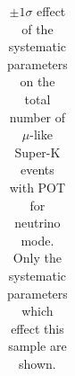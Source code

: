 \begin{table}
\begin{tabular}{| l | r | r | r  r | r  r |}
\hline

\end{tabular}
\caption{
$\pm 1 \sigma$ effect of the systematic parameters on the total number of $\mu$-like Super-K events with
\TotalPotNu{} POT for neutrino 
mode.
  Only the systematic parameters which effect this sample are shown.
    \label{tab:syst_pm1sigma_mulike_fhc}
}
\end{table}
